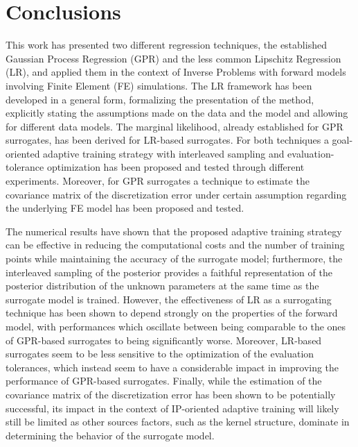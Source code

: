 \section{Conclusions}\label{sec:conclusions}
This work has presented two different regression techniques, the established Gaussian Process Regression (GPR) and the less common Lipschitz Regression (LR), and applied them in the context of Inverse Problems with forward models involving Finite Element (FE) simulations. 
The LR framework has been developed in a general form, formalizing the presentation of the method, explicitly stating the assumptions made on the data and the model and allowing for different data models.
The marginal likelihood, already established for GPR surrogates, has been derived for LR-based surrogates.
For both techniques a goal-oriented adaptive training strategy with interleaved sampling and evaluation-tolerance optimization has been proposed and tested through different experiments.
Moreover, for GPR surrogates a technique to estimate the covariance matrix of the discretization error under certain assumption regarding the underlying FE model has been proposed and tested. \medskip

The numerical results have shown that the proposed adaptive training strategy can be effective in reducing the computational costs and the number of training points while maintaining the accuracy of the surrogate model; furthermore, the interleaved sampling of the posterior provides a faithful representation of the posterior distribution of the unknown parameters at the same time as the surrogate model is trained.
However, the effectiveness of LR as a surrogating technique has been shown to depend strongly on the properties of the forward model, with performances which oscillate between being comparable to the ones of GPR-based surrogates to being significantly worse.
Moreover, LR-based surrogates seem to be less sensitive to the optimization of the evaluation tolerances, which instead seem to have a considerable impact in improving the performance of GPR-based surrogates.
Finally, while the estimation of the covariance matrix of the discretization error has been shown to be potentially successful, its impact in the context of IP-oriented adaptive training will likely still be limited as other sources factors, such as the kernel structure, dominate in determining the behavior of the surrogate model.\medskip

